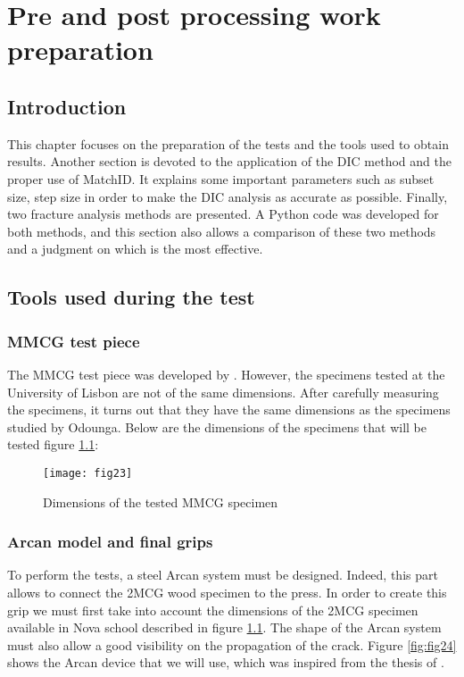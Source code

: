 \chapter{Pre and post processing work preparation}
\label{Chapter2}

\section{Introduction}

This chapter focuses on the preparation of the tests and the tools used to obtain results. Another section is devoted to the application of the DIC method and the proper use of MatchID. It explains some important parameters such as subset size, step size in order to make the DIC analysis as accurate as possible.
Finally, two fracture analysis methods are presented. A Python code was developed for both methods, and this section also allows a comparison of these two methods and a judgment on which is the most effective.

\section{Tools used during the test}

\subsection{MMCG test piece}

The MMCG test piece was developed by \cite{MoutouPitti2008}. However, the specimens tested at the University of Lisbon are not of the same dimensions. After carefully measuring the specimens, it turns out that they have the same dimensions as the specimens studied by Odounga. Below are the dimensions of the specimens that will be tested figure \ref{fig:fig23}:


\begin{figure}[htp]
	\centering
	\texttt{[image: fig23]}
	\caption{Dimensions of the tested MMCG specimen}
	\label{fig:fig23}
\end{figure}

\subsection{Arcan model and final grips}

To perform the tests, a steel Arcan system must be designed. Indeed, this part allows to connect the 2MCG wood specimen to the press. In order to create this grip we must first take into account the dimensions of the 2MCG specimen available in Nova school described in figure \ref{fig:fig23}. The shape of the Arcan system must also allow a good visibility on the propagation of the crack. Figure \ref{fig:fig24} shows the Arcan device that we will use, which was inspired from the thesis of \cite{Odounga2018phd}.


